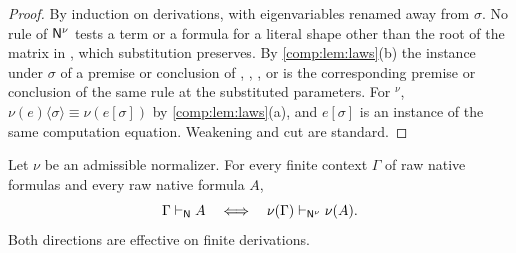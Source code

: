 \begin{proof}
By induction on derivations, with eigenvariables renamed away from $\sigma$.
No rule of $\mathsf{N}^{\nu}$ tests a term or a formula for a literal shape other
than the root of the matrix in , which substitution preserves.
By \cref{comp:lem:laws}(b) the instance under $\sigma$ of a premise or
conclusion of , , ,  or
 is the corresponding premise or conclusion of the same rule at
the substituted parameters. For $^{\nu}$,
$\nu(e)\langle\sigma\rangle\equiv\nu(e[\sigma])$ by \cref{comp:lem:laws}(a),
and $e[\sigma]$ is an instance of the same computation equation. Weakening
and cut are standard.
\end{proof}

\begin{theorem}[Transfer]
\label{comp:thm:transfer}
Let $\nu$ be an admissible normalizer. For every finite context $\Gamma$ of
raw native formulas and every raw native formula $A$,
\[
 \Gamma\vdash_{\mathsf{N}}A
 \quad\Longleftrightarrow\quad
 \nu(\Gamma)\vdash_{\mathsf{N}^{\nu}}\nu(A).
\]
Both directions are effective on finite derivations.
\end{theorem}

